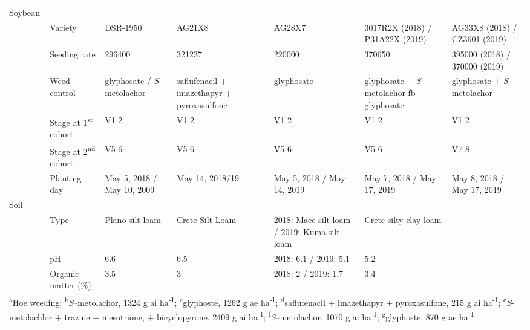 \begin{table}[!h]
{\begin{tabular}[t]{lllllll}
Soybean &  &  &  &  &  & \\

 & Variety & DSR-1950 & AG21X8 & AG28X7 & 3017R2X (2018) / P31A22X (2019) & AG33X8 (2018) / CZ3601 (2019) \\

 & Seeding rate & 296400 & 321237 & 220000 & 370650 & 395000 (2018) / 370000 (2019) \\

 & Weed control & glyphosate / \emph{S}-metolachor & saflufenacil + imazethapyr + pyroxasulfone & glyphosate & glyphosate + \emph{S}-metolachor fb glyphosate & glyphosate + \emph{S}-metolachor \\

 & Stage at 1\textsuperscript{st} cohort & V1-2 & V1-2 & V1-2 & V1-2 & V1-2 \\

 & Stage at 2\textsuperscript{nd} cohort & V5-6 & V5-6 & V5-6 & V5-6 & V7-8\\

\multirow{-6}{*}{\raggedright\arraybackslash } & Planting day & May 5, 2018 / May 10, 2009 & May 14, 2018/19 & May 5, 2018 / May 14, 2019 & May 7, 2018 / May 17, 2019 & May 8, 2018 / May 17, 2019 \\

Soil &  &  &  &  &  & \\

 & Type & Plano-silt-loam & Crete Silt Loam & 2018: Mace silt loam / 2019: Kuma silt loam & Crete silty clay loam & \\

 & pH & 6.6 & 6.5 & 2018: 6.1 / 2019: 5.1 & 5.2 & \\

\multirow{-4}{*}{\raggedright\arraybackslash } & Organic matter (\%) & 3.5 & 3 & 2018: 2 / 2019: 1.7 & 3.4 & \\
\bottomrule
\multicolumn{7}{l}{\rule{0pt}{1em}\textsuperscript{a}Hoe weeding; \textsuperscript{b}\emph{S}--metolachor, 1324 g ai ha\textsuperscript{-1}; \textsuperscript{c}glyphoste, 1262 g ae ha\textsuperscript{-1}; \textsuperscript{d}saflufenacil + imazethapyr + pyroxasulfone, 215 g ai ha\textsuperscript{-1}; \textsuperscript{e}\emph{S}-metolachlor + trazine + mesotrione, + bicyclopyrone, 2409 g ai ha\textsuperscript{-1}; \textsuperscript{f}\emph{S}--metolachor, 1070 g ai ha\textsuperscript{-1}; \textsuperscript{g}glyphoste, 870 g ae ha\textsuperscript{-1}} \\
\end{tabular}}
\end{table}




